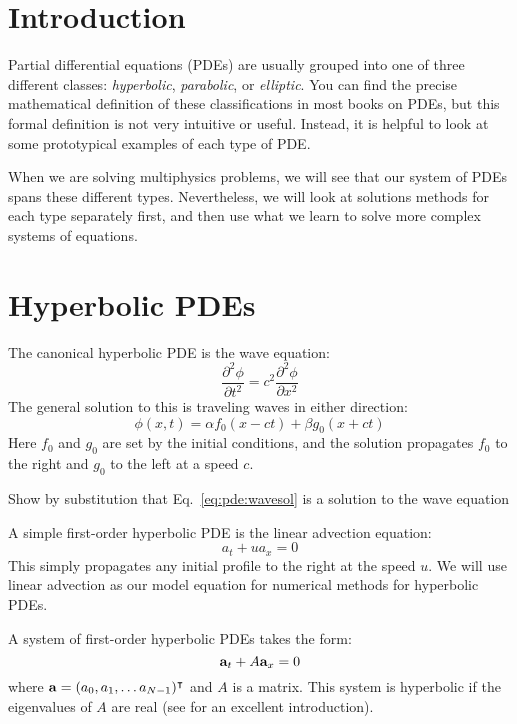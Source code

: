 \section{Introduction}

Partial differential equations (PDEs) are usually grouped into one of
three different classes: {\em hyperbolic}, {\em parabolic}, or {\em
  elliptic}.  You can find the precise mathematical definition of
these classifications in most books on PDEs, but this formal
definition is not very intuitive or useful.  Instead, it is helpful to
look at some prototypical examples of each type of PDE.

When we are solving multiphysics problems, we will see that our 
system of PDEs spans these different types.  Nevertheless, we will
look at solutions methods for each type separately first, and then
use what we learn to solve more complex systems of equations.

\section{Hyperbolic PDEs}

The canonical hyperbolic PDE is the wave equation:
\begin{equation}
  \frac{\partial^2 \phi}{\partial t^2} = c^2 \frac{\partial^2 \phi}{\partial x^2}
\end{equation}   
The general solution to this is traveling waves in either direction:
\begin{equation}
\label{eq:pde:wavesol}
  \phi(x,t) = \alpha f_0(x - ct) + \beta g_0(x + ct)
\end{equation}
Here $f_0$ and $g_0$ are set by the initial
conditions, and the solution propagates $f_0$ to the right and $g_0$ to
the left at a speed $c$.

\begin{exercise}
{Show by substitution that Eq.~\ref{eq:pde:wavesol} is a solution
to the wave equation}
\end{exercise}

A simple first-order hyperbolic PDE is the linear advection equation:
\begin{equation}
a_t + u a_x = 0
\end{equation}
This simply propagates any initial profile to the right at the speed
$u$.  We will use linear advection as our model equation for numerical
methods for hyperbolic PDEs.

A system of first-order hyperbolic PDEs takes the form:
\begin{equation}
{\bf a}_t + A {\bf a}_x = 0
\end{equation}
where ${\bf a} = (a_0, a_1, \ldots a_{N-1})^\intercal$ and $A$ is a matrix.
This system is hyperbolic if the eigenvalues of $A$ are real (see
\cite{leveque:2002} for an excellent introduction).

